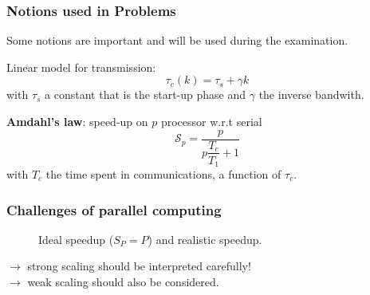 \begin{frame}
  \frametitle{Notions used in Problems}
Some notions are important and will be used during the examination.

\medskip
Linear model for transmission:
\begin{equation}
\tau_c(k) = \tau_s + \gamma k
\end{equation}
with $\tau_s$ a constant that is the start-up phase and $\gamma$ the inverse bandwith.

\textbf{Amdahl's law}: speed-up on $p$ processor w.r.t serial
\begin{equation*}
\mathcal{S}_p = \dfrac{p}{p\dfrac{T_c}{T_1} + 1}
\end{equation*}
with $T_c$ the time spent in communications, a function of $\tau_c$.


\end{frame}

\begin{frame}
  \frametitle{Challenges of parallel computing}


\begin{figure}
  \centering
  \caption{Ideal speedup ($S_P = P$) and realistic speedup.}
  \label{fig:scalability}
\end{figure}

\medskip
$\rightarrow$ strong scaling should be interpreted carefully!\\
$\rightarrow$ weak scaling should also be considered.

\end{frame}

